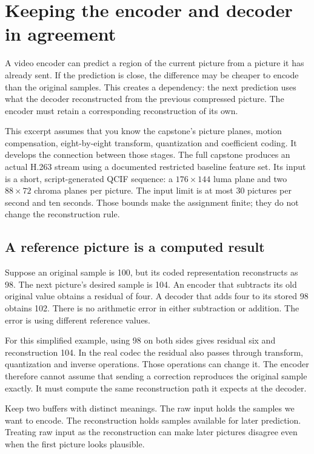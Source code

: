 \chapter{Keeping the encoder and decoder in agreement}
\label{revision:h263-reconstruction}

A video encoder can predict a region of the current picture from a picture it has
already sent. If the prediction is close, the difference may be cheaper to encode
than the original samples. This creates a dependency: the next prediction uses
what the decoder reconstructed from the previous compressed picture. The encoder
must retain a corresponding reconstruction of its own.

This excerpt assumes that you know the capstone's picture planes, motion
compensation, eight-by-eight transform, quantization and coefficient coding.
It develops the connection between those stages. The full capstone produces an
actual H.263 stream using a documented restricted baseline feature set. Its input
is a short, script-generated QCIF sequence: a $176\times144$ luma plane and two
$88\times72$ chroma planes per picture. The input limit is at most 30 pictures
per second and ten seconds. Those bounds make the assignment finite; they do
not change the reconstruction rule.

\section{A reference picture is a computed result}

Suppose an original sample is 100, but its coded representation reconstructs as
98. The next picture's desired sample is 104. An encoder that subtracts its old
original value obtains a residual of four. A decoder that adds four to its stored
98 obtains 102. There is no arithmetic error in either subtraction or addition.
The error is using different reference values.

For this simplified example, using 98 on both sides gives residual six and
reconstruction 104. In the real codec the residual also passes through transform,
quantization and inverse operations. Those operations can change it. The encoder
therefore cannot assume that sending a correction reproduces the original sample
exactly. It must compute the same reconstruction path it expects at the decoder.

Keep two buffers with distinct meanings. The raw input holds the samples we want
to encode. The reconstruction holds samples available for later prediction.
Treating raw input as the reconstruction can make later pictures disagree even
when the first picture looks plausible.

